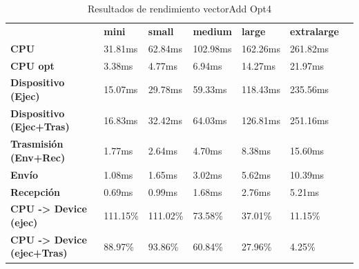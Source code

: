 \begin{table}[H]
    \centering
    \begin{tabular}{lllllll}
    \rowcolor[HTML]{DAE8FC} \ &  \textbf{mini} &  \textbf{small} &  \textbf{medium} &  \textbf{	large} &  \textbf{	extralarge} \\
    \cellcolor[HTML]{DAE8FC} \textbf{CPU} & 31.81ms & 62.84ms & 102.98ms & 	162.26ms & 	261.82ms \\
    \rowcolor[HTML]{EFEFEF} \cellcolor[HTML]{DAE8FC} \textbf{CPU opt} & 3.38ms & 4.77ms & 6.94ms & 	14.27ms & 	21.97ms \\
    \cellcolor[HTML]{DAE8FC} \textbf{Dispositivo (Ejec)} & 15.07ms & 29.78ms & 59.33ms & 	118.43ms & 	235.56ms \\
    \rowcolor[HTML]{EFEFEF} \cellcolor[HTML]{DAE8FC} \textbf{Dispositivo (Ejec+Tras)} & 16.83ms & 32.42ms & 64.03ms & 	126.81ms & 	251.16ms \\
    \cellcolor[HTML]{DAE8FC} \textbf{Trasmisión (Env+Rec)} & 1.77ms & 2.64ms & 4.70ms & 	8.38ms & 	15.60ms \\
    \rowcolor[HTML]{EFEFEF} \cellcolor[HTML]{DAE8FC} \textbf{Envío} & 1.08ms & 1.65ms & 3.02ms & 	5.62ms & 	10.39ms \\
    \cellcolor[HTML]{DAE8FC} \textbf{Recepción} & 0.69ms & 0.99ms & 1.68ms & 	2.76ms & 	5.21ms \\
    \rowcolor[HTML]{EFEFEF} \cellcolor[HTML]{DAE8FC} \textbf{CPU -> Device (ejec)} & 111.15\% & 111.02\% & 73.58\% & 	37.01\% & 	11.15\% \\
    \cellcolor[HTML]{DAE8FC} \textbf{CPU -> Device (ejec+Tras)} & 88.97\% & 93.86\% & 60.84\% & 	27.96\% & 	4.25\% \\
    \end{tabular}
    \caption[Resultados de rendimiento vectorAdd Opt4]{{Resultados de rendimiento vectorAdd Opt4}}
    \label{table_test_vectorAdd_Opt4_hw_performanceResults}
\end{table}